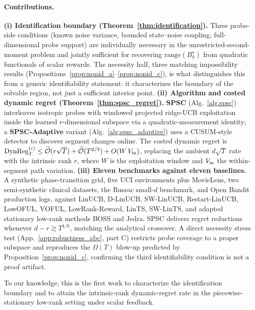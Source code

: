 \documentclass{article}
\newcommand{\tilO}{\widetilde{\mathcal{O}}}
\newcommand{\DynReg}{\mathrm{DynReg}}
\newcommand{\range}{\mathrm{range}}
\begin{document}
\paragraph{Contributions.}
\textbf{(i) Identification boundary
(Theorem~\ref{thm:identification}).} Three probe-side conditions
(known noise variance, bounded state--noise coupling,
full-dimensional probe support) are individually necessary in the
unrestricted-second-moment problem and jointly sufficient for
recovering $\range(B_k^\star)$ from quadratic functionals of scalar
rewards. The necessity half, three matching impossibility results
(Propositions~\ref{prop:nonid_a}--\ref{prop:nonid_c}), is what
distinguishes this from a generic identifiability statement: it
characterizes the boundary of the solvable region, not just a
sufficient interior point.
\textbf{(ii) Algorithm and costed dynamic regret
(Theorem~\ref{thm:spsc_regret}).} \textbf{SPSC} (Alg.~\ref{alg:spsc})
interleaves isotropic probes with windowed projected ridge-UCB
exploitation inside the learned $r$-dimensional subspace via a
quadratic-measurement identity; a \textbf{SPSC-Adaptive}
variant (Alg.~\ref{alg:spsc_adaptive}) uses a CUSUM-style detector
to discover segment changes online. The costed dynamic regret is
$\DynReg_T^{(c)}\le \tilO(r\sqrt T)+\tilO(T^{2/3})+O(W\,V_{\rm in})$,
replacing the ambient $d\sqrt T$ rate with the intrinsic rank $r$,
where $W$ is the exploitation window and $V_{\rm in}$ the
within-segment path variation.
\textbf{(iii) Eleven benchmarks against eleven baselines.} A
synthetic phase-transition grid, five UCI environments plus
MovieLens, two semi-synthetic clinical datasets, the Russac small-$d$
benchmark, and Open Bandit production logs, against LinUCB, D-LinUCB,
SW-LinUCB, Restart-LinUCB, LowOFUL, VOFUL, LowRank-Reward, LinTS,
SW-LinTS, and adapted stationary low-rank methods BOSS and Jedra.
SPSC delivers regret reductions whenever $d-r\gtrsim T^{1/6}$,
matching the analytical crossover. A direct necessity stress test
(App.~\ref{app:robustness_abc}, part C) restricts probe coverage to a
proper subspace and reproduces the $\Omega(T)$ blow-up predicted by
Proposition~\ref{prop:nonid_c}, confirming the third identifiability
condition is not a proof artifact.

To our knowledge, this is the first work to characterize the
identification boundary and to attain the intrinsic-rank
dynamic-regret rate in the piecewise-stationary low-rank setting
under scalar feedback.
\end{document}
